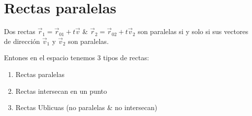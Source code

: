 
\section{Rectas paralelas}
Dos rectas $\vec{r}_1 = \vec{r}_{01} + t \vec{v}$ \& $\vec{r}_{2} = \vec{r}_{02} + t \vec{v}_2 $ son paralelas si y solo si sus vectores de dirección $\vec{v}_1$ y $\vec{v}_2 $ son paralelas.
\begin{figure}[htbp]
    \centering
    \caption{}
    \label{}
\end{figure} 

Entones en el espacio tenemos 3 tipos de rectas:
\begin{enumerate}
    \item Rectas paralelas  
    \item Rectas intersecan en un punto
    \item Rectas Ublicuas (no paralelas \& no intersecan)
\end{enumerate}

